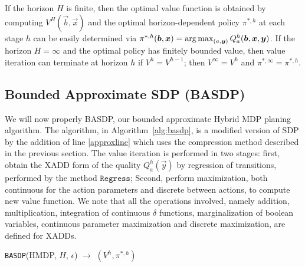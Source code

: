 If the horizon $H$ is finite, then the optimal value function is
obtained by computing $V^H(\vec{b},\vec{x})$ and the optimal
horizon-dependent policy $\pi^{*,h}$ at each stage $h$ can be easily
determined via $\pi^{*,h}(\vec{b},\vec{x}) = \argmax_{(a, \vec{y} )} Q^h_a(\vec{b},\vec{x},\vec{y})$.  If the horizon $H
= \infty$ and the optimal policy has finitely bounded value, then
value iteration can terminate at horizon $h$ if $V^{h} = V^{h-1}$;
then $V^\infty = V^h$ and $\pi^{*,\infty} = \pi^{*,h}$.


\subsection{Bounded Approximate SDP (BASDP)}
We will now properly BASDP, our bounded approximate Hybrid MDP planing algorithm. The  algorithm, in Algorithm~\ref{alg:basdp}, is a modified version of SDP by the addition of line \ref{approxline} which uses the compression method described in the previous section. The value iteration is performed in two stages: first, obtain the XADD form of the quality $Q^h_a(\vec{y})$ by regression of transitions, performed by the method $\texttt{Regress}$; Second, perform maximization, both continuous for the action parameters and discrete between actions, to compute new value function. We note that all the operations involved, namely addition, multiplication, integration of continuous $\delta$ functions, marginalization of boolean variables, continuous parameter maximization and discrete maximization, are defined for XADDs. 

\incmargin{.5em}
\linesnumbered
\begin{algorithm}[th!]
\vspace{-.5mm}
\dontprintsemicolon
{}
\caption{\footnotesize \texttt{BASDP}(HMDP, $H$, $\epsilon$) $\longrightarrow$ $(V^h,\pi^{*,h})$ \label{alg:basdp}}
\vspace{-1mm}
\end{algorithm}
\decmargin{.5em}

